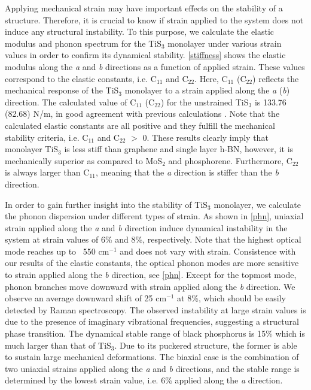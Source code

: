 Applying mechanical strain may have important effects on the stability of a structure. Therefore, it is crucial to know if  strain applied to the system does not induce any structural instability. To this purpose, we calculate the elastic modulus and phonon spectrum for the TiS$_3$ monolayer under various strain values in order to confirm its dynamical stability.  \autoref{stiffness} shows the elastic modulus along the \textit{a}  and \textit{b}  directions as a function of applied strain. These values correspond to the elastic constants, i.e.  C$_{11}$ and C$_{22}$.  Here, C$_{11}$ (C$_{22}$) reflects the mechanical response of the TiS$_3$ monolayer to a strain applied along the \textit{a} (\textit{b}) direction.  The calculated value of C$_{11}$ (C$_{22}$) for the unstrained TiS$_3$ is 133.76 (82.68) N/m, in good agreement with previous calculations \cite{Dai2015,kang2015m}. Note that the calculated elastic constants are all positive and they fulfill the mechanical stability criteria, i.e. C$_{11}$ and C$_{22}$ $>$ 0. These results clearly imply that monolayer TiS$_3$ is less stiff than graphene and single layer h-BN, however, it is mechanically superior as compared to MoS$_2$ and phosphorene\cite{deniz2}. Furthermore, C$_{22}$ is always larger than C$_{11}$, meaning that the \textit{a} direction is stiffer than the \textit{b} direction. 

In order to gain further insight into the stability of TiS$_3$ monolayer, we calculate the phonon dispersion under different types of strain. As shown in \autoref{phn},  uniaxial strain applied along the \textit{a} and \textit{b} direction induce dynamical instability in the system at strain values of 6\% and 8\%, respectively.  Note that the highest optical mode reaches up to ~550 cm$^{-1}$ and does not vary with strain. Consistence with our results of the elastic constants, the optical phonon modes are more sensitive to strain applied along the \textit{b} direction, see \autoref{phn}. Except for the topmost mode,  phonon branches move downward with strain applied along the \textit{b} direction.  We observe an average downward shift of 25 cm$^{-1}$ at 8\%, which should be easily detected by Raman spectroscopy.  The observed instability at large strain values is due to the presence of imaginary vibrational frequencies, suggesting a structural phase transition. The dynamical stable range of black phosphorus is 15\% which is much larger than that of TiS$_3$\cite{0953-8984-27-17-175006}.  Due to its puckered structure, the former is able to sustain large mechanical deformations.  The biaxial case is the combination of two uniaxial strains applied along the \textit{a} and \textit{b} directions, and the stable range is determined by the lowest strain value, i.e. 6\% applied along the \textit{a} direction. 

